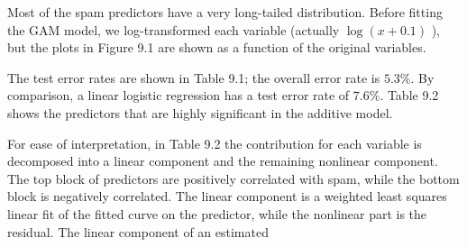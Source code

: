 \documentclass[10pt]{article}
\begin{document}
Most of the spam predictors have a very long-tailed distribution. Before fitting the GAM model, we log-transformed each variable (actually $\log (x+ 0.1)$ ), but the plots in Figure 9.1 are shown as a function of the original variables.

The test error rates are shown in Table 9.1; the overall error rate is $5.3 \%$. By comparison, a linear logistic regression has a test error rate of $7.6 \%$. Table 9.2 shows the predictors that are highly significant in the additive model.

For ease of interpretation, in Table 9.2 the contribution for each variable is decomposed into a linear component and the remaining nonlinear component. The top block of predictors are positively correlated with spam, while the bottom block is negatively correlated. The linear component is a weighted least squares linear fit of the fitted curve on the predictor, while the nonlinear part is the residual. The linear component of an estimated
\end{document}

